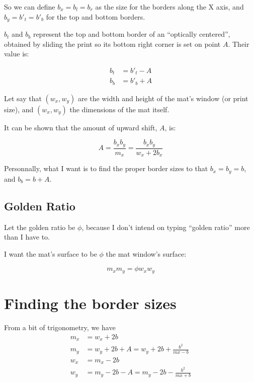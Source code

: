 \documentclass[
    paper=letter,
    parskip=half-,
    DIV=10,
]{scrreprt}
\begin{document}
    So we can define $b_x = b_l = b_r$ as the size for the borders along the X axis, and $b_y = b'_t = b'_b$ for the top and bottom borders.

    $b_t$ and $b_b$ represent the top and bottom border of an “optically centered”, obtained by sliding the print so its bottom right corner is set on point $A$. Their value is:

    \begin{align*}
        b_t &= b'_t - A \\
        b_b &= b'_b + A
    \end{align*}

    Let say that $(w_x, w_y)$ are the width and height of the mat’s window (or print size), and $(w_x, w_y)$ the dimensions of the mat itself.

    It can be shown that the amount of upward shift, $A$, is:

    \[
        A = \frac{b_x b_y}{m_x} = \frac{b_x b_y}{w_x + 2b_x}
    \]


    Personnally, what I want is to find the proper border sizes to that $b_x = b_y = b$, and $b_b = b + A$.


\section{Golden Ratio}

    Let the golden ratio be $\phi$, because I don’t intend on typing “golden ratio” more than I have to.

    I want the mat's surface to be $\phi$ the mat window's surface:

    \begin{equation*}
        m_x m_y = \phi w_x w_y
    \end{equation*}


\chapter{Finding the border sizes}

    From a bit of trigonometry, we have
    \begin{align}
        m_x &= w_x + 2b \\
        m_y &= w_y + 2b + A = w_y + 2b + \frac{b^2}{mx - b} \\
        w_x &= m_x - 2b \\
        w_y &= m_y - 2b - A = m_y - 2b - \frac{b^2}{mx + b}
    \end{align}
\end{document}
